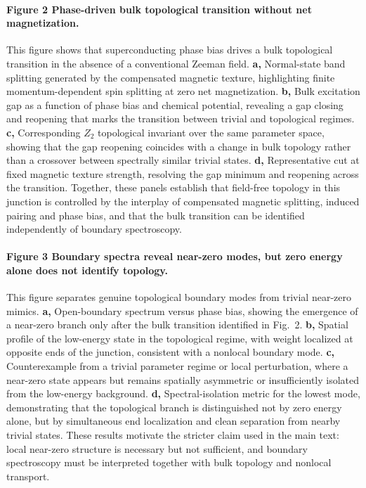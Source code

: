 \documentclass[11pt]{article}
\begin{document}
\paragraph{Figure 2 \textbar{} Phase-driven bulk topological transition without net magnetization.}
This figure shows that superconducting phase bias drives a bulk topological transition in the absence of a conventional Zeeman field. \textbf{a,} Normal-state band splitting generated by the compensated magnetic texture, highlighting finite momentum-dependent spin splitting at zero net magnetization. \textbf{b,} Bulk excitation gap as a function of phase bias and chemical potential, revealing a gap closing and reopening that marks the transition between trivial and topological regimes. \textbf{c,} Corresponding $Z_2$ topological invariant over the same parameter space, showing that the gap reopening coincides with a change in bulk topology rather than a crossover between spectrally similar trivial states. \textbf{d,} Representative cut at fixed magnetic texture strength, resolving the gap minimum and reopening across the transition. Together, these panels establish that field-free topology in this junction is controlled by the interplay of compensated magnetic splitting, induced pairing and phase bias, and that the bulk transition can be identified independently of boundary spectroscopy.

\paragraph{Figure 3 \textbar{} Boundary spectra reveal near-zero modes, but zero energy alone does not identify topology.}
This figure separates genuine topological boundary modes from trivial near-zero mimics. \textbf{a,} Open-boundary spectrum versus phase bias, showing the emergence of a near-zero branch only after the bulk transition identified in Fig.~2. \textbf{b,} Spatial profile of the low-energy state in the topological regime, with weight localized at opposite ends of the junction, consistent with a nonlocal boundary mode. \textbf{c,} Counterexample from a trivial parameter regime or local perturbation, where a near-zero state appears but remains spatially asymmetric or insufficiently isolated from the low-energy background. \textbf{d,} Spectral-isolation metric for the lowest mode, demonstrating that the topological branch is distinguished not by zero energy alone, but by simultaneous end localization and clean separation from nearby trivial states. These results motivate the stricter claim used in the main text: local near-zero structure is necessary but not sufficient, and boundary spectroscopy must be interpreted together with bulk topology and nonlocal transport.
\end{document}
